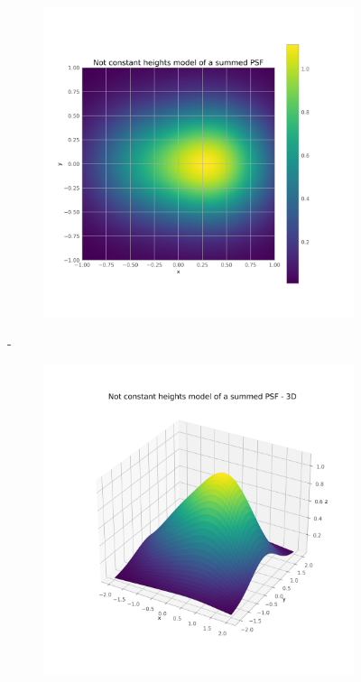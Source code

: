        \begin{figure}[H]
        \centering
        \begin{subfigure}{.45\textwidth}
            \includegraphics[width=\textwidth]{report/Figures/models/model_psf_notconst.png}
        \end{subfigure}%
        \hspace{1em}-
        \begin{subfigure}{.45\textwidth}
            \centering
            \includegraphics[width=\textwidth]{report/Figures/models/model_psf_notconst_3d.png}
        \end{subfigure}
        \caption{}
        \label{model_psf_notconst}
        \end{figure}

